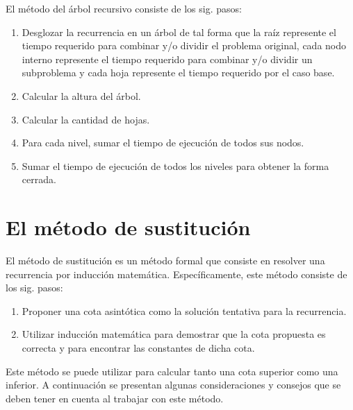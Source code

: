 El método del árbol recursivo consiste de los sig. pasos:

\begin{enumerate}
    \item Desglozar la recurrencia en un árbol de tal forma que la raíz represente
    el tiempo requerido para combinar y/o dividir el problema original,
    cada nodo interno represente el tiempo requerido para combinar y/o
    dividir un subproblema y cada hoja represente el tiempo requerido
    por el caso base. 
    \item Calcular la altura del árbol.
    \item Calcular la cantidad de hojas.
    \item Para cada nivel, sumar el tiempo de ejecución de todos sus nodos. 
    \item Sumar el tiempo de ejecución de todos los niveles para obtener la
    forma cerrada.
\end{enumerate}

\section{El método de sustitución}

El método de sustitución es un método formal que consiste en resolver
una recurrencia por inducción matemática. Específicamente, este método
consiste de los sig. pasos:

\begin{enumerate}
    \item Proponer una cota asintótica como la solución tentativa
    para la recurrencia.
    \item Utilizar inducción matemática para demostrar que la cota propuesta
    es correcta y para encontrar las constantes de dicha cota.
\end{enumerate}

Este método se puede utilizar para calcular tanto una cota superior
como una inferior. A continuación se presentan algunas consideraciones
y consejos que se deben tener en cuenta al trabajar con este método. 


